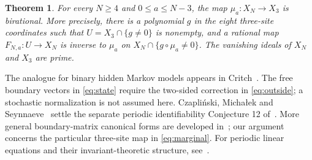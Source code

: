 \documentclass[11pt]{article}
\newtheorem{theorem}{Theorem}
\begin{document}
\begin{theorem}\label{thm:main}
For every $N\geq4$ and $0\leq a\leq N-3$, the map $\mu_a:X_N\to X_3$
is birational. More precisely, there is a polynomial $g$ in the eight
three-site coordinates such that $U=X_3\cap\{g\ne0\}$ is nonempty, and a
rational map $F_{N,a}:U\to X_N$ is inverse to $\mu_a$ on
$X_N\cap\{g\circ\mu_a\ne0\}$.
The vanishing ideals of $X_N$ and $X_3$ are prime.
\end{theorem}

The analogue for binary hidden Markov models appears in
Critch~\cite[Theorems 4.1 and 5.11]{HMM}. The free boundary vectors in
\eqref{eq:state} require the two-sided correction in \eqref{eq:outside}; a
stochastic normalization is not assumed here. Czapli\'nski, Micha\l{}ek and
Seynnaeve~\cite[Section 3.4, Theorem 3.30 of the arXiv version]{CMS}
settle the separate periodic identifiability Conjecture 12 of~\cite{CM}.
More general boundary-matrix canonical forms are developed
in~\cite[Sections 3--5]{FLAC}; our argument concerns the particular
three-site map in \eqref{eq:marginal}. For periodic linear equations and
their invariant-theoretic structure, see~\cite{LS}.
\end{document}
